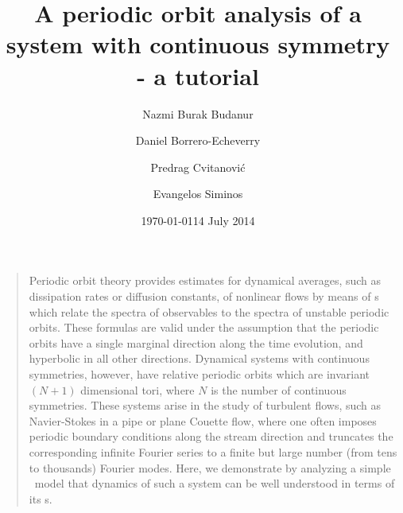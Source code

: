 \documentclass[aip,cha,
reprint,
secnumarabic,
nofootinbib, tightenlines,
nobibnotes, showkeys, showpacs,
groupedaddress,
]{revtex4-1}
\begin{document}
\title[An analysis of a system with continuous symmetry]
{A periodic orbit analysis of a system with continuous symmetry - a tutorial}

\author{Nazmi Burak Budanur}
\author{Daniel Borrero-Echeverry}
\author{Predrag Cvitanovi\'{c}}
\author{Evangelos Siminos}
    \ifdraft
\date{\today}
    \else
\date{14 July 2014}
   \fi



\maketitle

\begin{quotation}
Periodic orbit theory provides estimates for dynamical
averages, such as dissipation rates or diffusion constants, of nonlinear
flows by means of {\cycForm s} which relate the spectra of observables
to the spectra of unstable periodic orbits. These formulas are valid
under the assumption that the periodic orbits have a single marginal
direction along the time evolution, and hyperbolic in all other
directions. Dynamical systems with continuous symmetries, however, have
relative periodic orbits which are invariant $(N+1)$ dimensional tori, where $N$
is the number of continuous symmetries. These systems arise in the study
of turbulent flows, such as Navier-Stokes in a pipe or plane Couette
flow, where one often imposes periodic boundary conditions along the
stream direction and truncates the corresponding infinite Fourier series
to a finite but large number (from tens to thousands) Fourier modes.
Here, we demonstrate by analyzing a simple \twomode\ model that
dynamics of such a system can be well understood in terms of its 
\rpo s.
\end{quotation}








\end{document}
